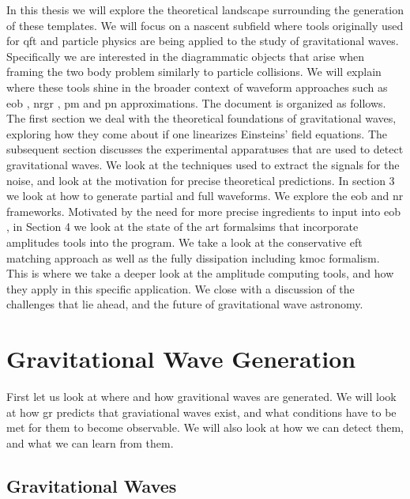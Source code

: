 \documentclass[
  10pt,
  a4paper,
  DIV=11,
  numbers=noendperiod,
  oneside]{scrreprt}
\DeclareRobustCommand{\[}{\begin{equation}}
\DeclareRobustCommand{\]}{\end{equation}}
\begin{document}
In this thesis we will explore the theoretical landscape surrounding the
generation of these templates. We will focus on a nascent subfield where
tools originally used for \gls{qft} and particle physics are being
applied to the study of gravitational waves. Specifically we are
interested in the diagrammatic objects that arise when framing the two
body problem similarly to particle collisions. We will explain where
these tools shine in the broader context of waveform approaches such as
\gls{eob} , \gls{nrgr} , \gls{pm} and \gls{pn} approximations. The
document is organized as follows. The first section we deal with the
theoretical foundations of gravitational waves, exploring how they come
about if one linearizes Einsteins' field equations. The subsequent
section discusses the experimental apparatuses that are used to detect
gravitational waves. We look at the techniques used to extract the
signals for the noise, and look at the motivation for precise
theoretical predictions. In section 3 we look at how to generate partial
and full waveforms. We explore the \gls{eob} and \gls{nr} frameworks.
Motivated by the need for more precise ingredients to input into
\gls{eob} , in Section 4 we look at the state of the art formalsims that
incorporate amplitudes tools into the program. We take a look at the
conservative \gls{eft} matching approach as well as the fully
dissipation including \gls{kmoc} formalism. This is where we take a
deeper look at the amplitude computing tools, and how they apply in this
specific application. We close with a discussion of the challenges that
lie ahead, and the future of gravitational wave astronomy.


\hypertarget{gravitational-wave-generation}{%
\chapter{Gravitational Wave
Generation}\label{gravitational-wave-generation}}

First let us look at where and how gravitional waves are generated. We
will look at how \gls{gr} predicts that graviational waves exist, and
what conditions have to be met for them to become observable. We will
also look at how we can detect them, and what we can learn from them.

\hypertarget{gravitational-waves}{%
\section{Gravitational Waves}\label{gravitational-waves}}
\end{document}
